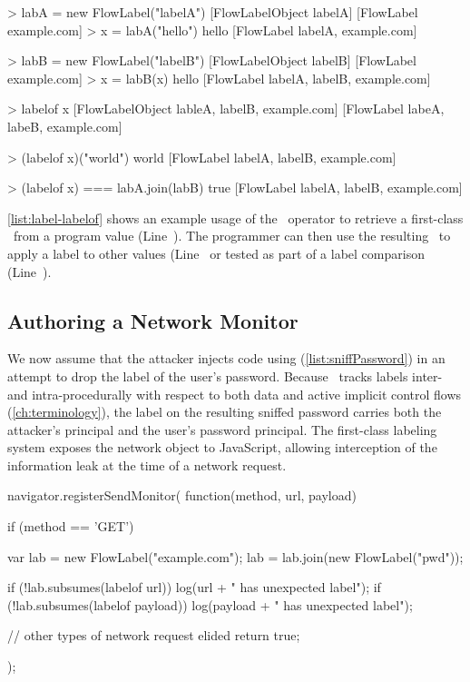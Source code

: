 \begin{jscode}
> labA = new FlowLabel("labelA")
  [FlowLabelObject labelA] [FlowLabel example.com]
> x = labA("hello")
  hello [FlowLabel labelA, example.com]

> labB = new FlowLabel("labelB")
  [FlowLabelObject labelB] [FlowLabel example.com]
> x = labB(x)
  hello [FlowLabel labelA, labelB, example.com]

> labelof x
  [FlowLabelObject lableA, labelB, example.com]
    [FlowLabel labeA, labeB, example.com]

> (labelof x)("world")
  world [FlowLabel labelA, labelB, example.com]

> (labelof x) === labA.join(labB)
  true [FlowLabel labelA, labelB, example.com]
\end{jscode}

\autoref{list:label-labelof} shows an example usage of the \mlabelof\ operator to retrieve a first-class \FlowLabelObject\ from a program value (Line~).
The programmer can then use the resulting \FlowLabelObject\ to apply a label to other values (Line~ or tested as part of a label comparison (Line~).

\subsection{Authoring a Network Monitor}
\label{subsec:network-monitor}

We now assume that the attacker injects code using  (\autoref{list:sniffPassword}) in an attempt to drop the label of the user's password.
Because \JitFlow\ tracks labels inter- and intra-procedurally with respect to both data and active implicit control flows (\autoref{ch:terminology}), the label on the resulting sniffed password carries both the attacker's principal and the user's password principal.
The first-class labeling system exposes the network object to JavaScript, allowing interception of the information leak at the time of a network request.

\begin{jscode}
navigator.registerSendMonitor(
  function(method, url, payload) {
    if (method == 'GET') {
      var lab = new FlowLabel("example.com");
      lab = lab.join(new FlowLabel("pwd"));

      if (!lab.subsumes(labelof url))
        log(url + " has unexpected label");
      if (!lab.subsumes(labelof payload))
        log(payload + " has unexpected label");
    }
    // other types of network request elided
    return true;
  });
\end{jscode}

